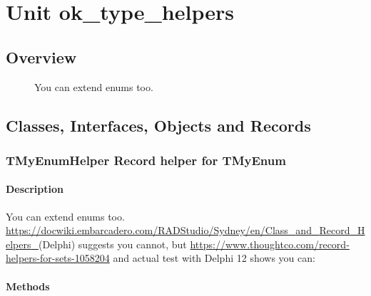 \documentclass{report}
\newif\ifpdf
\begin{document}
\label{toc}\tableofcontents
\newpage
\newlength{\tmplength}
\chapter{Unit ok{\_}type{\_}helpers}
\label{ok_type_helpers}
\section{Overview}
\begin{description}
\item[\texttt{\begin{ttfamily}TStringHelper\end{ttfamily} Record}]
\item[\texttt{\begin{ttfamily}TMyEnumHelper\end{ttfamily} Record}]You can extend enums too.
\end{description}
\section{Classes, Interfaces, Objects and Records}
\ifpdf
\subsection*{\large{\textbf{TMyEnumHelper Record helper for TMyEnum}}\normalsize\hspace{1ex}\hrulefill}
\else
\subsection*{TMyEnumHelper Record helper for TMyEnum}
\fi
\label{ok_type_helpers.TMyEnumHelper}
\subsubsection*{\large{\textbf{Description}}\normalsize\hspace{1ex}\hfill}
You can extend enums too. \href{https://docwiki.embarcadero.com/RADStudio/Sydney/en/Class_and_Record_Helpers_}{https://docwiki.embarcadero.com/RADStudio/Sydney/en/Class{\_}and{\_}Record{\_}Helpers{\_}}(Delphi) suggests you cannot, but \href{https://www.thoughtco.com/record-helpers-for-sets-1058204}{https://www.thoughtco.com/record-helpers-for-sets-1058204} and actual test with Delphi 12 shows you can:\subsubsection*{\large{\textbf{Methods}}\normalsize\hspace{1ex}\hfill}
\end{document}
